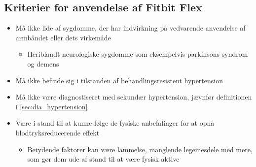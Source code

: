 \subsection*{Kriterier for anvendelse af Fitbit Flex}
\begin{itemize}
\item Må ikke lide af sygdomme, der har indvirkning på vedvarende anvendelse af armbåndet eller dets virkemåde 
	\begin{itemize}
	\item Heriblandt neurologiske sygdomme som eksempelvis parkinsons syndrom og demens
	\end{itemize}

\item Må ikke befinde sig i tilstanden af behandlingsresistent hypertension 

\item Må ikke være diagnostiseret med sekundær hypertension, jævnfør definitionen i \autoref{sec:dia_hypertension} %

\item Være i stand til at kunne følge de fysiske anbefalinger for at opnå blodtryksreducerende effekt 
	\begin{itemize}
	\item Betydende faktorer kan være lammelse, manglende legemesdele med mere, som gør dem ude af stand til at være fysisk aktive 
	\end{itemize}  

\end{itemize}




